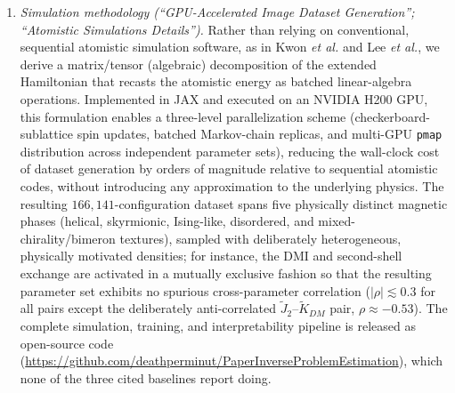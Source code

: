 \documentclass[review,12pt]{report}
\newenvironment{reviewer}{\setcounter{pointcounter}{1}}{}
\begin{document}
\begin{reviewer}
{\begin{enumerate}
\item \textit{Simulation methodology (``GPU-Accelerated Image Dataset Generation''; ``Atomistic Simulations Details'').} Rather than relying on conventional, sequential atomistic simulation software, as in Kwon \textit{et al.} and Lee \textit{et al.}, we derive a matrix/tensor (algebraic) decomposition of the extended Hamiltonian that recasts the atomistic energy as batched linear-algebra operations. Implemented in JAX and executed on an NVIDIA H200 GPU, this formulation enables a three-level parallelization scheme (checkerboard-sublattice spin updates, batched Markov-chain replicas, and multi-GPU \texttt{pmap} distribution across independent parameter sets), reducing the wall-clock cost of dataset generation by orders of magnitude relative to sequential atomistic codes, without introducing any approximation to the underlying physics. The resulting $166{,}141$-configuration dataset spans five physically distinct magnetic phases (helical, skyrmionic, Ising-like, disordered, and mixed-chirality/bimeron textures), sampled with deliberately heterogeneous, physically motivated densities; for instance, the DMI and second-shell exchange are activated in a mutually exclusive fashion so that the resulting parameter set exhibits no spurious cross-parameter correlation ($|\rho|\lesssim0.3$ for all pairs except the deliberately anti-correlated $\tilde{J}_2$--$\tilde{K}_{DM}$ pair, $\rho\approx-0.53$). The complete simulation, training, and interpretability pipeline is released as open-source code (\url{https://github.com/deathperminut/PaperInverseProblemEstimation}), which none of the three cited baselines report doing.


\end{enumerate}}
\end{reviewer}
\end{document}
